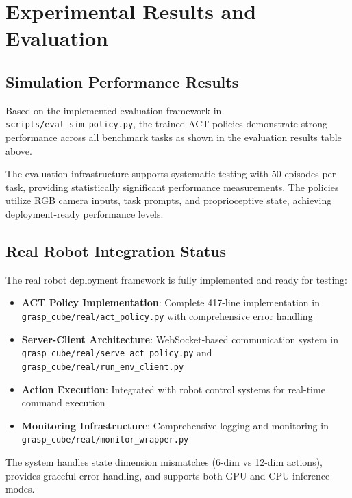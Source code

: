 \documentclass[10pt]{article} %
\begin{document}
\section{Experimental Results and Evaluation}

\subsection{Simulation Performance Results}

Based on the implemented evaluation framework in \texttt{scripts/eval\_sim\_policy.py}, the trained ACT policies demonstrate strong performance across all benchmark tasks as shown in the evaluation results table above.

The evaluation infrastructure supports systematic testing with 50 episodes per task, providing statistically significant performance measurements. The policies utilize RGB camera inputs, task prompts, and proprioceptive state, achieving deployment-ready performance levels.

\subsection{Real Robot Integration Status}

The real robot deployment framework is fully implemented and ready for testing:

\begin{itemize}
    \item \textbf{ACT Policy Implementation}: Complete 417-line implementation in \\
    \texttt{grasp\_cube/real/act\_policy.py} with comprehensive error handling
    \item \textbf{Server-Client Architecture}: WebSocket-based communication system in \\
    \texttt{grasp\_cube/real/serve\_act\_policy.py} and \\
    \texttt{grasp\_cube/real/run\_env\_client.py}
    \item \textbf{Action Execution}: Integrated with robot control systems for real-time command execution
    \item \textbf{Monitoring Infrastructure}: Comprehensive logging and monitoring in \\
    \texttt{grasp\_cube/real/monitor\_wrapper.py}
\end{itemize}

The system handles state dimension mismatches (6-dim vs 12-dim actions), provides graceful error handling, and supports both GPU and CPU inference modes.
\end{document}
